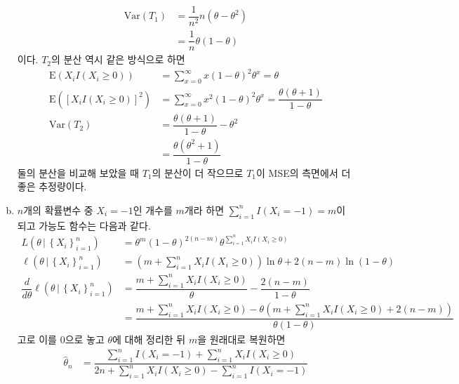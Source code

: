 \documentclass[answers]{exam}
\begin{document}
\begin{questions}
\begin{solution}
\begin{enumerate}[(a)]
        \begin{align}
          \mathrm{Var}\left(T_{1}\right) &= \dfrac{1}{n^{2}}n\left(\theta-\theta^{2}\right)\\
          &=\dfrac{1}{n}\theta\left(1-\theta\right)
        \end{align}
        이다. $T_{2}$의 분산 역시 같은 방식으로 하면
        \begin{align}
          \mathrm{E}\left(X_{i}I\left(X_{i}\geq 0\right)\right) &= \sum_{x=0}^{\infty}x\left(1-\theta\right)^{2}\theta^{x} = \theta\\
          \mathrm{E}\left(\left[X_{i}I\left(X_{i}\geq 0\right)\right]^{2}\right) &= \sum_{x=0}^{\infty}x^{2}\left(1-\theta\right)^{2}\theta^{x}=\dfrac{\theta\left(\theta+1\right)}{1-\theta}\\
          \mathrm{Var}\left(T_{2}\right) &= \dfrac{\theta\left(\theta+1\right)}{1-\theta}-\theta^{2}\\
          &=\dfrac{\theta\left(\theta^{2}+1\right)}{1-\theta}
        \end{align}
        둘의 분산을 비교해 보았을 때 $T_{1}$의 분산이 더 작으므로 $T_{1}$이 MSE의 측면에서 더 좋은 추정량이다.
        \item $n$개의 확률변수 중 $X_{i}=-1$인 개수를 $m$개라 하면 $\sum_{i=1}^{n}I\left(X_{i}=-1\right)=m$이 되고 가능도 함수는 다음과 같다.
        \begin{align}
          L\left(\theta\,|\,\left\{X_{i}\right\}_{i=1}^{n}\right) &= \theta^{m}\left(1-\theta\right)^{2\left(n-m\right)}\theta^{\sum_{i=1}^{n}X_{i}I\left(X_{i}\geq 0\right)}\\
          \ell\left(\theta\,|\,\left\{X_{i}\right\}_{i=1}^{n}\right) &= \left(m+\sum_{i=1}^{n}X_{i}I\left(X_{i}\geq 0\right)\right)\ln\theta +2\left(n-m\right)\ln\left(1-\theta\right)\\
          \dfrac{d}{d\theta}\ell\left(\theta\,|\,\left\{X_{i}\right\}_{i=1}^{n}\right) &= \dfrac{m+\displaystyle\sum_{i=1}^{n}X_{i}I\left(X_{i}\geq 0\right)}{\theta}-\dfrac{2\left(n-m\right)}{1-\theta}\\
          &= \dfrac{m+\displaystyle\sum_{i=1}^{n}X_{i}I\left(X_{i}\geq 0\right)-\theta\left(m+\sum_{i=1}^{n}X_{i}I\left(X_{i}\geq 0\right)+2\left(n-m\right)\right)}{\theta\left(1-\theta\right)}
        \end{align}
        고로 이를 0으로 놓고 $\theta$에 대해 정리한 뒤 $m$을 원래대로 복원하면
        \begin{align}
          \widehat{\theta}_{n} &= \dfrac{\displaystyle\sum_{i=1}^{n}I\left(X_{i}=-1\right)+\sum_{i=1}^{n}X_{i}I\left(X_{i}\geq 0\right)}{2n + \displaystyle\sum_{i=1}^{n}X_{i}I\left(X_{i}\geq 0 \right)-\sum_{i=1}^{n}I\left(X_{i}=-1\right)}\\

\end{align}
\end{enumerate}
\end{solution}
\end{questions}
\end{document}
